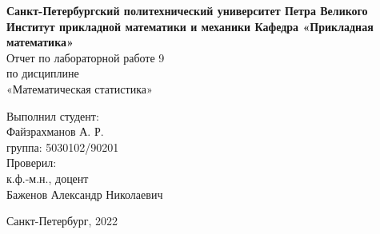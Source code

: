 \documentclass[oneside,final]{article}
\begin{document}
	\begin{titlepage}
		\newpage 
		\begin{center}
			{\bfseries Санкт-Петербургский политехнический университет
			Петра Великого \\
			Институт прикладной математики и механики
				Кафедра «Прикладная математика»\\}  
			\vfill
			\vfill
			\normalsize{Отчет по лабораторной работе 9\\
					по дисциплине\\
				«Математическая статистика»\\}   
			\vfill		                    
		\end{center}
		\begin{flushright}
		\begin{minipage}{.45\textwidth}
			\normalsize{Выполнил студент:\\
			Файзрахманов А. Р. \\
			группа: 5030102/90201}
			\break\hfill\break
			\\
			\normalsize{Проверил:\\
			к.ф.-м.н., доцент\\
			Баженов Александр Николаевич} 
		
\end{minipage}
		\end{flushright}
		\begin{center}
			\vfill
			\normalsize{Санкт-Петербург, 2022}
		\end{center}
	\end{titlepage}

	\tableofcontents
	\newpage
	\listoffigures
	\newpage
	
	
\end{document}
